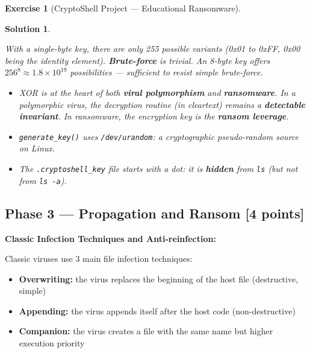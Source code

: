 \documentclass[a4paper,11pt]{article}
\theoremstyle{plain}
\newtheorem{correction}{Solution}
\theoremstyle{definition}
\newtheorem{exercice}{Exercise}
\begin{document}
\begin{exercice}[CryptoShell Project --- Educational Ransomware]
\begin{correction}
\begin{attention}
With a single-byte key, there are only 255 possible variants (0x01 to 0xFF, 0x00 being the identity element). \textbf{Brute-force} is trivial. An 8-byte key offers $256^8 \approx 1.8 \times 10^{19}$ possibilities --- sufficient to resist simple brute-force.
\end{attention}

\begin{pointcle}
\begin{itemize}
    \item XOR is at the heart of both \textbf{viral polymorphism} and \textbf{ransomware}. In a polymorphic virus, the decryption routine (in cleartext) remains a \textbf{detectable invariant}. In ransomware, the encryption key is the \textbf{ransom leverage}.
    \item \texttt{generate\_key()} uses \texttt{/dev/urandom}: a cryptographic pseudo-random source on Linux.
    \item The \texttt{.cryptoshell\_key} file starts with a dot: it is \textbf{hidden} from \texttt{ls} (but not from \texttt{ls -a}).
\end{itemize}
\end{pointcle}

\end{correction}



\subsection*{Phase 3 --- Propagation and Ransom \hfill \normalsize [4 points]}

\begin{rappel}
\textbf{Classic Infection Techniques and Anti-reinfection:}

Classic viruses use 3 main file infection techniques:
\begin{itemize}
    \item \textbf{Overwriting:} the virus replaces the beginning of the host file (destructive, simple)
    \item \textbf{Appending:} the virus appends itself after the host code (non-destructive)
    \item \textbf{Companion:} the virus creates a file with the same name but higher execution priority
\end{itemize}


\end{rappel}
\end{exercice}
\end{document}
